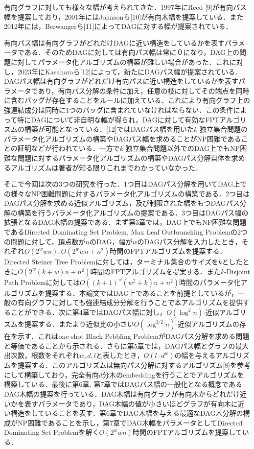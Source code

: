 \documentclass[master]{kuisthesis}		%
\theoremstyle{plain}
\theoremstyle{definition}
\begin{document}
有向グラフに対しても様々な幅が考えられてきた．1997年にReed [9]が有向パス幅を提案しており，2001年にはJohnsonら[10]が有向木幅を提案している．また2012年には，Berwangerら[11]によってDAGに対する幅が提案されている．

有向パス幅は有向グラフがどれだけDAGに近い構造をしているかを表すパラメータである．そのためDAGに対しては有向パス幅は常に０になり，DAG上の問題に対してパラメータ化アルゴリズムの構築が難しい場合があった．これに対し，2023年にKasaharaら[12]によって，新たにDAGパス幅が提案されている．DAGパス幅は有向グラフがどれだけ有向パスに近い構造をしているかを表すパラメータであり，有向パス分解の条件に加え，任意の枝に対してその端点を同時に含むバッグが存在することをルールに加えている．これにより有向グラフ上の強連結成分は同時に1つのバッグに含まれていなければならない．この条件によって特にDAGについて非自明な幅が得られ，DAGに対して有効なFPTアルゴリズムの構築が可能となっている．[12]ではDAGパス幅を用いた$k$-独立集合問題のパラメータ化アルゴリズムの構築やDAGパス幅を求めることがNP困難であることの証明などが行われている．一方で$k$-独立集合問題以外でのDAG上でもNP困難な問題に対するパラメータ化アルゴリズムの構築やDAGパス分解自体を求めるアルゴリズムは著者が知る限りこれまでわかっていなかった．


そこで今回は次の3つの研究を行った．1つ目はDAGパス分解を用いてDAG上での様々なNP困難問題に対するパラメータ化アルゴリズムの構築である．2つ目はDAGパス分解を求める近似アルゴリズム，及び制限された幅をもつDAGパス分解の構築を行うパラメータ化アルゴリズムの提案である．3つ目はDAGパス幅の拡張となるDAG木幅の提案である．まず第3章では，DAG上でもNP困難な問題であるDirected Dominating Set Problem, Max Leaf Outbranching Problemの2つの問題に対して，頂点数が$n$のDAG，幅が$w$のDAGパス分解を入力したとき，それぞれ$O(2^wwn), O(2^wwn+n^2)$時間のFPTアルゴリズムを提案する．Directed Steiner Tree Problemに対しては，ターミナル集合のサイズを$k$としたときに$O(2^w(k+w)n+n^2)$時間のFPTアルゴリズムを提案する．また$k$-Disjoint Path Problemに対しては$O((k+1)^w(w^2+k)n+n^2)$時間のパラメータ化アルゴリズムを提案する．本論文ではDAG上であることを前提としているが，一般の有向グラフに対しても強連結成分分解を行うことで本アルゴリズムを提供することができる．次に第4章ではDAGパス幅に対し，$O(\log^2 n)$-近似アルゴリズムを提案する．またより近似比の小さい$O(\log^{3/2} n)$-近似アルゴリズムの存在を示す．これはone-shot Black Pebbling ProblemがDAGパス分解を求める問題と等価であることから示される．さらに第5章では，DAGパス幅とグラフの最大出次数，根数をそれぞれ$w, d, l$と表したとき，$O(l\cdot d^w)$の幅を与えるアルゴリズムを提案する．このアルゴリズムは無向パス分解に対するアルゴリズム[8]を参考にして構築しており，完全有向$d$分木のembeddingを行うことでアルゴリズムを構築している．最後に第6章, 第7章ではDAGパス幅の一般化となる概念であるDAG木幅の提案を行っている．DAG木幅は有向グラフが有向木からどれだけ近いかを表すパラメータであり，DAG木幅の値が小さいほどグラフが有向木に近い構造をしていることを表す．第6章でDAG木幅を与える最適なDAG木分解の構成がNP困難であることを示し，第7章でDAG木幅をパラメータとしてDirected Dominating Set Problemを解く$O(2^wwn)$時間のFPTアルゴリズムを提案している．
\end{document}
